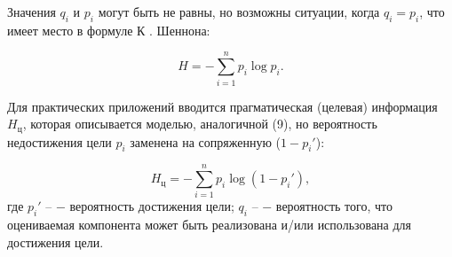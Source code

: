 \documentclass[a4paper,12pt]{report}
\begin{document}
Значения $q_i$ и $p_i$ могут быть не равны, но возможны ситуации, когда $q_i = p_i$, что имеет место в формуле К . Шеннона:

	\begin{equation}
\label{trivial}
H =  -\sum_{i = 1}^{n}p_i \log p_i.
\end{equation} 									      

	Для практических приложений вводится прагматическая (целевая) информация $H_ц$, которая описывается моделью, аналогичной (9), но вероятность недостижения цели $p_i$ заменена на сопряженную ($1 - p_i'$):

	\begin{equation}
\label{trivial}
H_ц = - \sum_{i=1}^{ n} p_i \log (1 - p_i'),
\end{equation} 
где $p_i' \mbox{ –}$ − вероятность достижения цели; $q_i \mbox{ –}$ − вероятность того, что оцениваемая компонента может быть реализована и/или использована для достижения цели.\\
\end{document}
